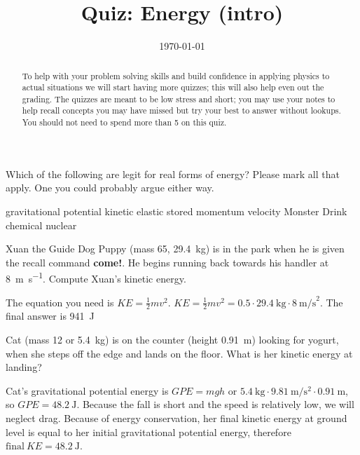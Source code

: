 \documentclass[quiz,addpoints,noanswers]{exam}
\title{Quiz: Energy (intro)}
\date{\today}
\author{\mobeardInstructorShort}
\begin{document}
\maketitle
\begin{abstract}
To help with your problem solving skills and build confidence in applying physics to actual situations we will start having more quizzes; this will also help even out the grading. The quizzes are meant to be low stress and short; you may use your notes to help recall concepts you may have missed but try your best to answer without lookups. You should not need to spend more than \SI{5}{\min} on this quiz. 
\end{abstract}

\begin{questions}
\question[1] Which of the following are legit for real forms of energy? Please mark all that apply. One you could probably argue either way.
\begin{choices}
\CorrectChoice gravitational potential
\CorrectChoice kinetic
\CorrectChoice elastic stored 
\choice momentum
\choice velocity
\choice Monster Drink
\CorrectChoice chemical 
\CorrectChoice nuclear
\end{choices}

\question[2] Xuan the Guide Dog Puppy (mass \SI{65}{\pound}, \SI{29.4}{\kilo\gram}) is in the park when he is given the recall command \textbf{come!}. He begins running back towards his handler at \SI{8}{\meter\per\second}. Compute Xuan's kinetic energy.  
\begin{solution}[1in]
The equation you need is $KE=\frac{1}{2}mv^2$. $KE=\frac{1}{2}mv^2=0.5\cdot\SI{29.4}{\kilo\gram}\cdot\SI{8}{\meter\per\second}^2$. The final answer is \SI{941}{\joule}
\end{solution}

\question[2] Cat (mass \SI{12}{\pound} or \SI{5.4}{\kilo\gram}) is on the counter (height \SI{0.91}{\meter}) looking for yogurt, when she steps off the edge and lands on the floor. What is her kinetic energy at landing?
\begin{solution}
Cat's gravitational potential energy is $GPE=mgh$ or $\SI{5.4}{\kilo\gram}\cdot\SI{9.81}{\meter\per\second\squared}\cdot\SI{0.91}{\meter}$, so $GPE=\SI{48.2}{\joule}$. Because the fall is short and the speed is relatively low, we will neglect drag. Because of energy conservation, her final kinetic energy at ground level is equal to her initial gravitational potential energy, therefore $\text{final}\ KE=\SI{48.2}{\joule}$. 
\end{solution} 

\end{questions}
\end{document}
